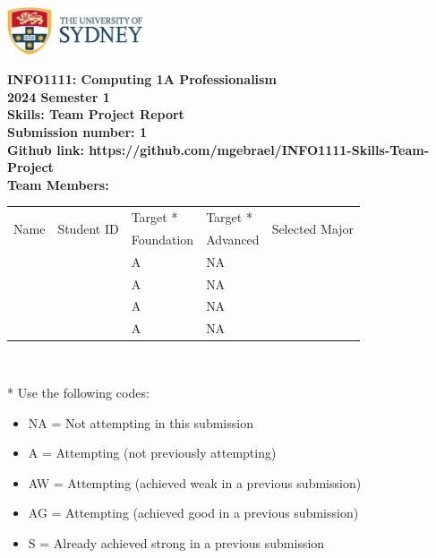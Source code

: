 \documentclass[a4paper, 11pt]{report}
\begin{document}
\begin{titlepage}
\begin{flushright}
\includegraphics[width=4cm]{USyd}\\[1cm]
\end{flushright}

\begin{centering}
\textbf{\huge INFO1111: Computing 1A Professionalism}\\[0.75cm]
\textbf{\huge 2024 Semester 1}\\[2cm]
\textbf{\huge Skills: Team Project Report}\\[2cm]

\textbf{\large Submission number: 1}\\[0.5cm]
\textbf{\large Github link: https://github.com/mgebrael/INFO1111-Skills-Team-Project}\\[0.75cm]
\textbf{\huge Team Members:}\\[0.75cm]

\begin{tabular}{|p{}|p{}|p{}|p{}|p{}|}
	\hline
	\multirow{2}{*}{Name} & \multirow{2}{*}{Student ID} & Target * & Target * & \multirow{2}{*}{Selected Major} \\
	 & & Foundation & Advanced & \\
	\hline
	\hline
	\raggedright{\studA} & \sidA & A & NA & \majA \\
	\hline
	\raggedright{\studB} & \sidB & A & NA & \majB \\
	\hline
	\raggedright{\studC} & \sidC & A & NA & \majC \\
	\hline
	\raggedright{\studD} & \sidD & A & NA & \majD \\
	\hline
\end{tabular}
\\[0.5cm]
\end{centering}

* Use the following codes:
\begin{itemize}
\setlength\itemsep{0em}
\item NA = Not attempting in this submission
\item A = Attempting (not previously attempting)
\item AW = Attempting (achieved weak in a previous submission) 
\item AG = Attempting (achieved good in a previous submission)
\item S = Already achieved strong in a previous submission
\end{itemize}

\thispagestyle{empty}
\end{titlepage}
\end{document}
